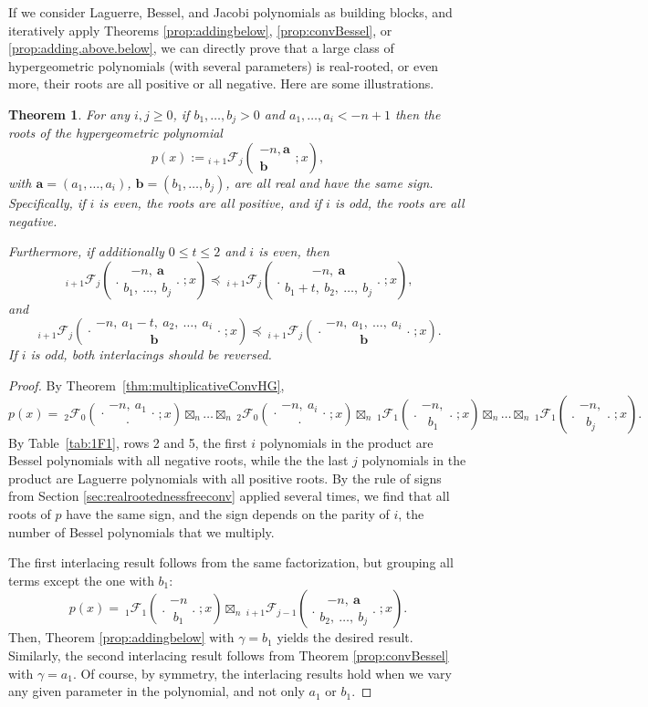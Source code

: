 \documentclass[reqno,11pt]{amsart}
\newtheorem{theorem}{Theorem}[section]
\theoremstyle{remark}
\newcommand*\pFq[5]{%
 {\ }_{#1}{\mathcal F}_{#2}{\left(\genfrac..{0pt}{}{#3}{#4};#5\right)}%
}
\begin{document}
If we consider Laguerre, Bessel, and Jacobi polynomials as building blocks, and iteratively apply Theorems \ref{prop:addingbelow}, \ref{prop:convBessel}, or \ref{prop:adding.above.below}, we can directly prove that a large class of hypergeometric polynomials (with several parameters) is real-rooted, or even more, their roots are all positive or all negative. Here are some illustrations.

\begin{theorem} \label{prop:42bis}
For any $i, j\geq 0$, if $b_1,\dots,b_j>0$ and  $a_1,\dots,a_{i}<-n+1$ then the roots of the hypergeometric polynomial
$$p(x):={}_{i+1} \mathcal F_j\left(\begin{matrix} -n, \bm a \\ \bm b 
\end{matrix};x\right),
$$
with $\bm a = \left( a_1,\dots,a_{i} \right)$, $\bm b = \left( b_1,\dots,b_{j} \right)$, are all real and have the same sign. Specifically, if $i$ is even, the roots are all positive, and if $i$ is odd, the roots are all negative. 

Furthermore, if additionally $0\leq t \leq 2$ and $i$ is even, then 
    $$\pFq{i+1}{j}{-n,\ \bm a}{ b_1,\ \dots,\ b_j}{x}\preccurlyeq\pFq{i+1}{j}{-n,\ \bm a}{ b_1+t,\ b_2,\ \dots,\ b_j}{x}, $$
and 
 $$
  \pFq{i+1}{j}{-n,\ a_1-t,\ a_2,\ \dots,\ a_{i}}{ \bm b}{x}
 \preccurlyeq \pFq{i+1}{j}{-n,\ a_1,\ \dots,\ a_{i}}{ \bm b}{x}
.$$
If $i$ is odd, both interlacings should be reversed.
\end{theorem}
\begin{proof}
By Theorem~\ref{thm:multiplicativeConvHG}, 
$$
p(x)= \pFq{2}{0}{-n,\  a_1}{\cdot }{x} \boxtimes_n  \dots \boxtimes_n \pFq{2}{0}{-n,\  a_i}{\cdot }{x}\boxtimes_n \pFq{1}{1}{-n,}{ b_1}{x} \boxtimes_n  \dots \boxtimes_n \pFq{1}{1}{-n,}{ b_j}{x} .
$$
By Table~\ref{tab:1F1}, rows 2 and 5, the first $i$ polynomials in the product are Bessel polynomials with all negative roots, while the the last $j$ polynomials in the product are Laguerre polynomials with all positive roots. By the rule of signs from Section \ref{sec:realrootednessfreeconv} applied several times, we find that all roots of $p$ have the same sign, and the sign depends on the parity of $i$, the number of Bessel polynomials that we multiply. 

The first interlacing result follows from the same factorization, but grouping all terms except the one with $b_1$:
$$
p(x)= \pFq{1}{1}{-n}{b_1}{x} \boxtimes_n  \pFq{i+1}{j-1}{-n,\ \bm a}{ b_2,\ \dots,\ b_j}{x}.
$$
Then, Theorem \ref{prop:addingbelow} with $\gamma=b_1$ yields the desired result. Similarly, the second interlacing result follows from Theorem \ref{prop:convBessel} with $\gamma=a_1$. Of course, by symmetry, the interlacing results hold when we vary any given parameter in the polynomial, and not only $a_1$ or $b_1$.
\end{proof}
\end{document}
